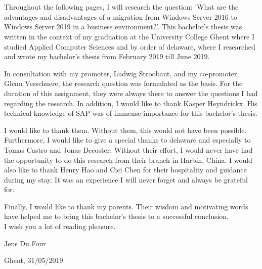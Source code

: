 
\chapter*{}
\label{ch:voorwoord}

Throughout the following pages, I will research the question: 'What are the advantages and disadvantages of a migration from Windows Server 2016 to Windows Server 2019 in a business environment?'. 
This bachelor's thesis was written in the context of my graduation at the University College Ghent where I studied Applied Computer Sciences and by order of delaware, where I researched and wrote my bachelor's thesis from February 2019 till June 2019.

In consultation with my promoter, Ludwig Stroobant, and my co-promoter, Glenn Verschuere, the research question was formulated as the basis. 
For the duration of this assignment, they were always there to answer the questions I had regarding the research. 
In addition, I would like to thank Kasper Heyndrickx. 
His technical knowledge of SAP was of immense importance for this bachelor's thesis.

I would like to thank them. 
Without them, this would not have been possible.
Furthermore, I would like to give a special thanks to delaware and especially to Tomas Castro and Jonas Decoster. 
Without their effort, I would never have had the opportunity to do this research from their branch in Harbin, China.
I would also like to thank Henry Hao and Cici Chen for their hospitality and guidance during my stay.
It was an experience I will never forget and always be grateful for. 

Finally, I would like to thank my parents. Their wisdom and motivating words have helped me to bring this bachelor's thesis to a successful conclusion.\\
I wish you a lot of reading pleasure.

Jens Du Four

Ghent, 31/05/2019